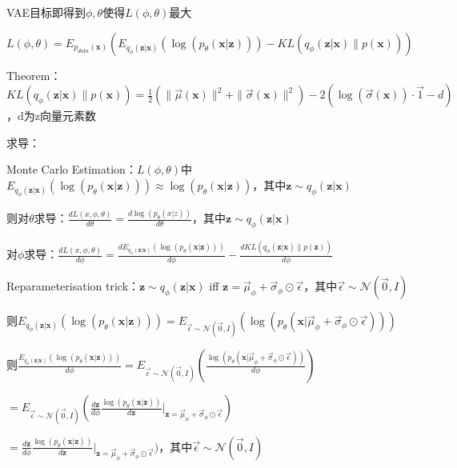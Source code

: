 \documentclass[UTF8]{ctexart}
\begin{document}
  \quad VAE目标即得到$\phi, \theta$使得$L(\phi, \theta)$最大

  \quad \quad $L(\phi, \theta) = E_{p_{data}(\mathbf{x})}(E_{q_{\phi}(\mathbf{z} | \mathbf{x})}(\log(p_{\theta}(\mathbf{x} | \mathbf{z}))) - KL(q_{\phi}(\mathbf{z} | \mathbf{x})\| p(\mathbf{x})))$

  \quad Theorem：$KL(q_{\phi}(\mathbf{z} | \mathbf{x})\| p(\mathbf{x})) = \frac{1}{2}(\|\vec{\mu}(\mathbf{x})\|^2 + \|\vec{\sigma}(\mathbf{x})\|^2) - 2(\log(\vec{\sigma}(\mathbf{x})) \cdot \vec{1} - d)$，d为z向量元素数

  求导：

  \quad Monte Carlo Estimation：$L(\phi, \theta)$中$E_{q_{\phi}(\mathbf{z} | \mathbf{x})}(\log(p_{\theta}(\mathbf{x} | \mathbf{z}))) \approx \log(p_{\theta}(\mathbf{x} | \mathbf{z}))$，其中$\mathbf{z} \sim q_{\phi}(\mathbf{z} | \mathbf{x})$

  \quad 则对$\theta$求导：$\frac{dL(x, \phi, \theta)}{d\theta} = \frac{d \log(p_{\theta}(x | z))}{d \theta}$，其中$\mathbf{z} \sim q_{\phi}(\mathbf{z} | \mathbf{x})$
  
  \quad 对$\phi$求导：$\frac{dL(x, \phi, \theta)}{d \phi} = \frac{d E_{q_{\phi}(\mathbf{z} | \mathbf{x})}(\log(p_{\theta}(\mathbf{x} | \mathbf{z})))}{d\phi} - \frac{d KL(q_{\phi}(\mathbf{z} | \mathbf{x}) \| p(\mathbf{z}))}{d\phi}$

  \quad \quad Reparameterisation trick：$\mathbf{z} \sim q_{\phi}(\mathbf{z} | \mathbf{x})$ iff $\mathbf{z} = \vec{\mu}_{\phi} + \vec{\sigma}_{\phi} \odot \vec{\epsilon}$，其中$\vec{\epsilon} \sim \mathcal{N}(\vec{0}, I)$

  \quad \quad 则$E_{q_{\phi}(\mathbf{z} | \mathbf{x})}(\log(p_{\theta}(\mathbf{x} | \mathbf{z}))) = E_{\vec{\epsilon} \sim \mathcal{N}(\vec{0}, I)}(\log(p_{\theta}(\mathbf{x} | \vec{\mu}_{\phi} + \vec{\sigma}_{\phi} \odot \vec{\epsilon})))$
  
  \quad \quad 则$\frac{E_{q_{\phi}(\mathbf{z} | \mathbf{x})}(\log(p_{\theta}(\mathbf{x} | \mathbf{z})))}{d \phi} = E_{\vec{\epsilon} \sim \mathcal{N}(\vec{0}, I)}(\frac{\log(p_{\theta}(\mathbf{x} | \vec{\mu}_{\phi} + \vec{\sigma}_{\phi} \odot \vec{\epsilon}))}{d\phi})$

  \quad \quad \quad $ = E_{\vec{\epsilon} \sim \mathcal{N}(\vec{0}, I)}(\frac{d\mathbf{z}}{d\phi}\frac{\log(p_{\theta}(\mathbf{x} | \mathbf{z}))}{d\mathbf{z}} |_{\mathbf{z} = \vec{\mu}_{\phi} + \vec{\sigma}_{\phi} \odot \vec{\epsilon}})$

  \quad \quad \quad $ = \frac{d\mathbf{z}}{d\phi}\frac{\log(p_{\theta}(\mathbf{x} | \mathbf{z}))}{d\mathbf{z}} |_{\mathbf{z} = \vec{\mu}_{\phi} + \vec{\sigma}_{\phi} \odot \vec{\epsilon}})$，其中$\vec{\epsilon} \sim \mathcal{N}(\vec{0}, I)$
  
\end{document}
